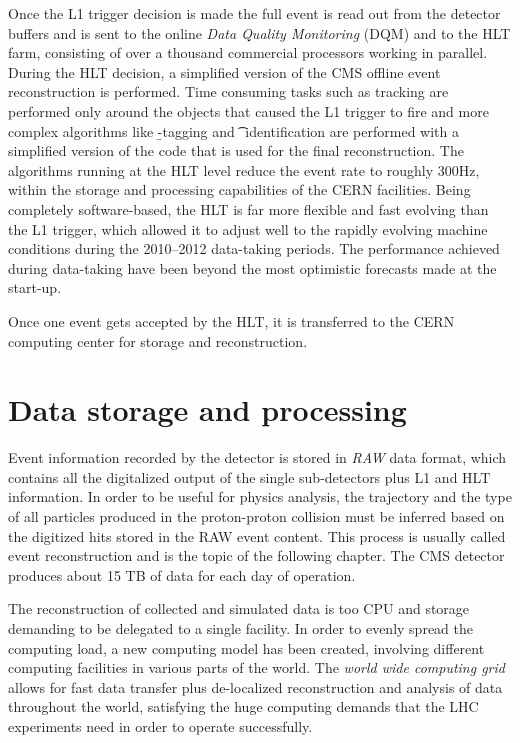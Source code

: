 Once the L1 trigger decision is made the full event is read out from the detector buffers and is sent to the online \emph{Data Quality Monitoring} (DQM) and to the HLT farm, consisting of over a thousand commercial processors working in parallel. During the HLT decision, a simplified version of the CMS offline event reconstruction is performed. Time consuming tasks such as tracking are performed only around the objects that caused the L1 trigger to fire and more complex algorithms like \b-tagging and \t~identification are performed with a simplified version of the code that is used for the final reconstruction. 
The algorithms running at the HLT level %
reduce the event rate to roughly 300Hz, within the storage and processing capabilities of the CERN facilities. Being completely software-based, the HLT is far more flexible and fast evolving than the L1 trigger, which allowed it to adjust well to the rapidly evolving machine conditions during the 2010--2012 data-taking periods. The performance achieved during data-taking have been beyond the most optimistic forecasts made at the start-up.

Once one event gets accepted by the HLT, it is transferred to the CERN computing center for storage and reconstruction.

\section{Data storage and processing}

Event information recorded by the detector is stored in \emph{RAW} data format, which contains all the digitalized output of the single sub-detectors plus L1 and HLT information. In order to be useful for physics analysis, the trajectory and the type of all particles produced in the proton-proton collision must be inferred based on the digitized hits stored in the RAW event content. This process is usually called event reconstruction and is the topic of the following chapter. The CMS detector produces about 15 TB of data for each day of operation.

The reconstruction of collected and simulated data is too CPU and storage demanding to be delegated to a single facility. In order to evenly spread the computing load, a new computing model has been created, involving different computing facilities in various parts of the world. The \emph{world wide computing grid} \cite{Malecki:2005gn} allows for fast data transfer plus de-localized reconstruction and analysis of data throughout the world, satisfying the huge computing demands that the LHC experiments need in order to operate successfully. 

